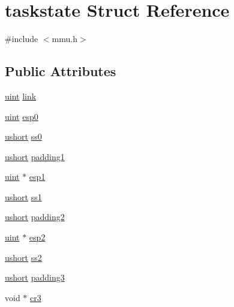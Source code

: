 \hypertarget{structtaskstate}{}\section{taskstate Struct Reference}
\label{structtaskstate}


{\ttfamily \#include $<$mmu.\+h$>$}

\subsection*{Public Attributes}
\begin{DoxyCompactItemize}
\item 
\hyperlink{custom__types_8h_a91ad9478d81a7aaf2593e8d9c3d06a14}{uint} \hyperlink{structtaskstate_a31a48a737b004273004ba8473ab6b0ed}{link}
\item 
\hyperlink{custom__types_8h_a91ad9478d81a7aaf2593e8d9c3d06a14}{uint} \hyperlink{structtaskstate_a41b3e1d46a5068485eb6714974a979d6}{esp0}
\item 
\hyperlink{custom__types_8h_ab95f123a6c9bcfee6a343170ef8c5f69}{ushort} \hyperlink{structtaskstate_a574e97ea3fd87f314da88afec3c6f574}{ss0}
\item 
\hyperlink{custom__types_8h_ab95f123a6c9bcfee6a343170ef8c5f69}{ushort} \hyperlink{structtaskstate_a6b87ceb039ec11ccd265818673c53df5}{padding1}
\item 
\hyperlink{custom__types_8h_a91ad9478d81a7aaf2593e8d9c3d06a14}{uint} $\ast$ \hyperlink{structtaskstate_a7ec69acf5f95163bd1ca2548fb0c541a}{esp1}
\item 
\hyperlink{custom__types_8h_ab95f123a6c9bcfee6a343170ef8c5f69}{ushort} \hyperlink{structtaskstate_ac70c36414956cfee04c733a5b530d8ef}{ss1}
\item 
\hyperlink{custom__types_8h_ab95f123a6c9bcfee6a343170ef8c5f69}{ushort} \hyperlink{structtaskstate_ae1bd6ae664d5899c3e118c21a27ba065}{padding2}
\item 
\hyperlink{custom__types_8h_a91ad9478d81a7aaf2593e8d9c3d06a14}{uint} $\ast$ \hyperlink{structtaskstate_af206a117571ede3752b043e4e8cc6016}{esp2}
\item 
\hyperlink{custom__types_8h_ab95f123a6c9bcfee6a343170ef8c5f69}{ushort} \hyperlink{structtaskstate_a573d8f57ef11630e782d8b7c924f28ce}{ss2}
\item 
\hyperlink{custom__types_8h_ab95f123a6c9bcfee6a343170ef8c5f69}{ushort} \hyperlink{structtaskstate_a7989f7ea66e6e2100ef68c9e6964c231}{padding3}
\item 
void $\ast$ \hyperlink{structtaskstate_ac891b558913b4528fd2c9351c99da201}{cr3}

\end{DoxyCompactItemize}
